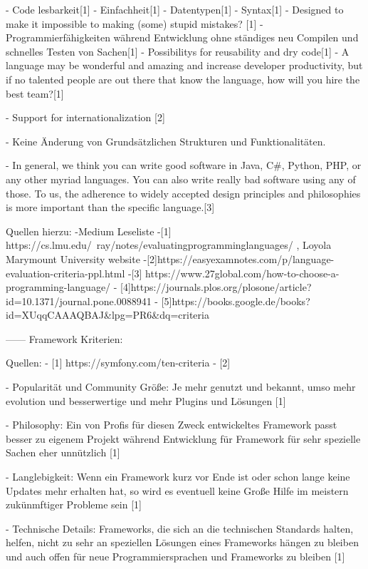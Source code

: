 - Code lesbarkeit[1]
- Einfachheit[1]
- Datentypen[1]
- Syntax[1]
- Designed to make it impossible to making (some) stupid mistakes? [1]
- Programmierfähigkeiten während Entwicklung ohne ständiges neu Compilen und schnelles Testen     von Sachen[1]
- Possibilitys for reusability and dry code[1]
- A language may be wonderful and amazing and increase developer productivity, but if no talented people are out there that know the language, how will you hire the best team?[1]

- Support for internationalization [2]

- Keine Änderung von Grundsätzlichen Strukturen und Funktionalitäten.

- In general, we think you can write good software in Java, C#, Python, PHP, or any other myriad languages. You can also write really bad software using any of those. To us, the adherence to widely accepted design principles and philosophies is more important than the specific language.[3]



Quellen hierzu:
-Medium Leseliste
-[1] https://cs.lmu.edu/~ray/notes/evaluatingprogramminglanguages/  , Loyola Marymount University website
-[2]https://easyexamnotes.com/p/language-evaluation-criteria-ppl.html
-[3] https://www.27global.com/how-to-choose-a-programming-language/
- [4]https://journals.plos.org/plosone/article?id=10.1371/journal.pone.0088941
- [5]https://books.google.de/books?id=XUqqCAAAQBAJ&lpg=PR6&dq=criteria%


------
Framework Kriterien:

Quellen:
- [1] https://symfony.com/ten-criteria
- [2]


- Popularität und Community Größe: Je mehr genutzt und bekannt, umso mehr evolution und besserwertige und mehr Plugins und Lösungen [1]

- Philosophy: Ein von Profis für diesen Zweck entwickeltes Framework passt besser zu eigenem Projekt während Entwicklung für Framework für sehr spezielle Sachen eher unnützlich [1]

- Langlebigkeit: Wenn ein Framework kurz vor Ende ist oder schon lange keine Updates mehr erhalten hat, so wird es eventuell keine Große Hilfe im meistern zukünmftiger Probleme sein [1]

- Technische Details: Frameworks, die sich an die technischen Standards halten, helfen, nicht zu sehr an speziellen Lösungen eines Frameworks hängen zu bleiben und auch offen für neue Programmiersprachen und Frameworks zu bleiben [1]

